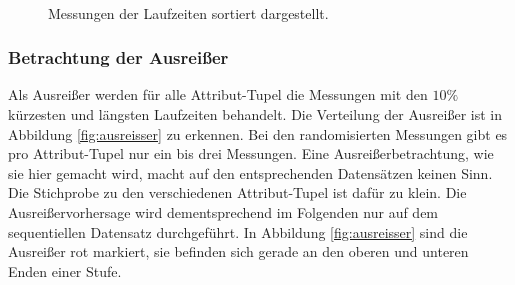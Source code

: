 \documentclass[
	12pt,
	a4paper,
	BCOR10mm,
	DIV14,
	listof=totoc,
	bibliography=totoc,
	headsepline
]{scrreprt}
\begin{document}
\begin{figure}
	\centering
	\hfill
	\\
	\hfill
	\caption{Messungen der Laufzeiten sortiert dargestellt.}
	\label{Laufzeiten_Sortiert}
\end{figure} 

\subsubsection{Betrachtung der Ausreißer}
Als Ausreißer werden für alle Attribut-Tupel die Messungen mit den $10\%$ kürzesten und längsten Laufzeiten behandelt. Die Verteilung der Ausreißer ist in Abbildung \ref{fig:ausreisser} zu erkennen.
Bei den randomisierten Messungen gibt es pro Attribut-Tupel nur ein bis drei Messungen. Eine Ausreißerbetrachtung, wie sie hier gemacht wird, macht auf den entsprechenden Datensätzen keinen Sinn. Die Stichprobe zu den verschiedenen Attribut-Tupel ist dafür zu klein.
Die Ausreißervorhersage wird dementsprechend im Folgenden nur auf dem sequentiellen Datensatz durchgeführt.
In Abbildung \ref{fig:ausreisser} sind die Ausreißer rot markiert, sie befinden sich gerade an den oberen und unteren Enden einer Stufe.
\end{document}
